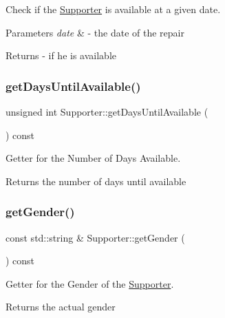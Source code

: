 Check if the \mbox{\hyperlink{class_supporter}{Supporter}} is available at a given date. 


\begin{DoxyParams}{Parameters}
{\em date} & -\/ the date of the repair \\
\hline
\end{DoxyParams}
\begin{DoxyReturn}{Returns}
-\/ if he is available 
\end{DoxyReturn}
\mbox{\label{class_supporter_ab7be7b4977d11b17e42781f0cd901ea2}} 
\subsubsection{\texorpdfstring{get\+Days\+Until\+Available()}{getDaysUntilAvailable()}}
{\footnotesize\ttfamily unsigned int Supporter\+::get\+Days\+Until\+Available (\begin{DoxyParamCaption}{ }\end{DoxyParamCaption}) const}



Getter for the Number of Days Available. 

\begin{DoxyReturn}{Returns}
the number of days until available 
\end{DoxyReturn}
\mbox{\label{class_supporter_a8feebeba31cad1469d14063eb7ace9ba}} 
\subsubsection{\texorpdfstring{get\+Gender()}{getGender()}}
{\footnotesize\ttfamily const std\+::string \& Supporter\+::get\+Gender (\begin{DoxyParamCaption}{ }\end{DoxyParamCaption}) const}



Getter for the Gender of the \mbox{\hyperlink{class_supporter}{Supporter}}. 

\begin{DoxyReturn}{Returns}
the actual gender 
\end{DoxyReturn}
\mbox{\label{class_supporter_a2b9a149408035ca7e3732ae2cb14fdd1}} 
